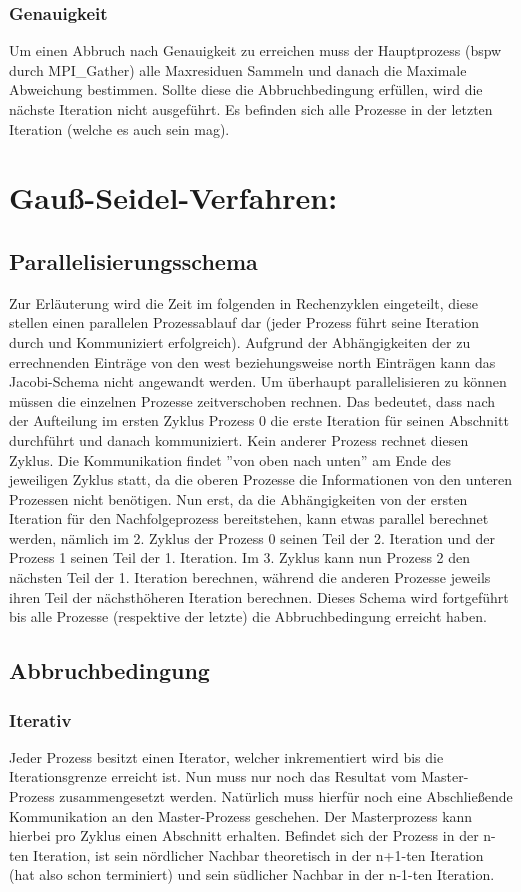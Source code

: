 \documentclass[a4paper,11pt,fleqn]{scrartcl}
\begin{document}
\subsubsection{Genauigkeit}
Um einen Abbruch nach Genauigkeit zu erreichen muss der Hauptprozess (bspw durch MPI\_Gather) alle Maxresiduen Sammeln und danach die Maximale Abweichung bestimmen. 
Sollte diese die Abbruchbedingung erfüllen, wird die nächste Iteration nicht ausgeführt.
Es befinden sich alle Prozesse in der letzten Iteration (welche es auch sein mag).

\section{Gauß-Seidel-Verfahren:}
\subsection{Parallelisierungsschema}
Zur Erläuterung wird die Zeit im folgenden in Rechenzyklen eingeteilt, diese stellen einen parallelen Prozessablauf dar (jeder Prozess führt seine Iteration durch und Kommuniziert erfolgreich).
Aufgrund der Abhängigkeiten der zu errechnenden Einträge von den west beziehungsweise north Einträgen kann das Jacobi-Schema nicht angewandt werden.
Um überhaupt parallelisieren zu können müssen die einzelnen Prozesse zeitverschoben rechnen.
Das bedeutet, dass nach der Aufteilung im ersten Zyklus Prozess 0 die erste Iteration für seinen Abschnitt durchführt und danach kommuniziert. 
Kein anderer Prozess rechnet diesen Zyklus.
Die Kommunikation findet ''von oben nach unten'' am Ende des jeweiligen Zyklus statt, da die oberen Prozesse die Informationen von den unteren Prozessen nicht benötigen.
Nun erst, da die Abhängigkeiten von der ersten Iteration für den Nachfolgeprozess bereitstehen, kann etwas parallel berechnet werden, nämlich im 2. 
Zyklus der Prozess 0 seinen Teil der 2. Iteration und der Prozess 1 seinen Teil der 1. Iteration.
Im 3. Zyklus kann nun Prozess 2 den nächsten Teil der 1. Iteration berechnen, während die anderen Prozesse jeweils ihren Teil der nächsthöheren Iteration berechnen.
Dieses Schema wird fortgeführt bis alle Prozesse (respektive der letzte) die Abbruchbedingung erreicht haben.
	
\subsection{Abbruchbedingung}
\subsubsection{Iterativ}
Jeder Prozess besitzt einen Iterator, welcher inkrementiert wird bis die Iterationsgrenze erreicht ist.
Nun muss nur noch das Resultat vom Master-Prozess zusammengesetzt werden. 
Natürlich muss hierfür noch eine Abschließende Kommunikation an den Master-Prozess geschehen.
Der Masterprozess kann hierbei pro Zyklus einen Abschnitt erhalten.
Befindet sich der Prozess in der n-ten Iteration, ist sein nördlicher Nachbar theoretisch in der n+1-ten Iteration (hat also schon terminiert) und sein südlicher Nachbar in der n-1-ten Iteration.
\end{document}
